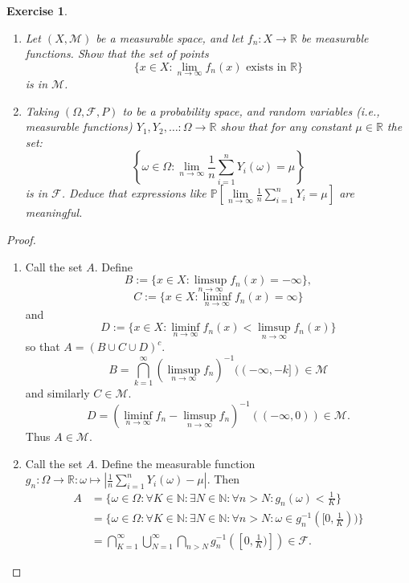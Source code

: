 \documentclass{article}
\newtheorem{exercise}[theorem]{Exercise}
\begin{document}
\begin{exercise}
\begin{enumerate}
\item[(a)] Let \((X, \mathcal{M})\) be a measurable space, and let \( f_n : X \to \mathbb{R} \) be measurable functions. Show that the set of points
    \[
    \{ x \in X : \lim\limits_{n \to \infty} f_n(x) \text{ exists in } \mathbb{R} \}
    \]
    is in \( \mathcal{M} \).
    
\item[(b)] Taking \((\Omega, \mathcal{F}, P)\) to be a probability space, and random variables (i.e., measurable functions) \( Y_1, Y_2, \dots : \Omega \to \mathbb{R} \) show that for any constant \(\mu \in \mathbb{R}\) the set:
    \[
    \left\{ \omega \in \Omega : \lim\limits_{n \to \infty} \frac{1}{n} \sum_{i=1}^{n} Y_i(\omega) = \mu \right\}
    \]
    is in \(\mathcal{F}\). Deduce that expressions like \( \mathbb{P}[\lim\limits_{n \to \infty} \frac{1}{n} \sum_{i=1}^{n} Y_i = \mu] \) are meaningful.
\end{enumerate}
\end{exercise} 
\begin{proof}
\begin{enumerate}
    \item[(a)] Call the set $A$. 
    Define \[B:=\{x\in X:\limsup_{n\to\infty}f_n(x)=-\infty\},\] \[C:=\{x\in X:\liminf_{n\to\infty}f_n(x)=\infty\}\] and \[D:=\{x\in X:\liminf_{n\to\infty}f_n(x)<\limsup_{n\to\infty}f_n(x)\}\] so that $A=(B\cup C\cup D)^c$. \[B=\bigcap_{k=1}^\infty(\limsup_{n\to\infty}f_n)^{-1}((-\infty,-k])\in\mathcal{M}\] and similarly $C\in\mathcal{M}$.\[D=(\liminf_{n\to\infty}f_n-\limsup_{n\to\infty}f_n)^{-1}((-\infty,0))\in\mathcal{M}.\] Thus $A\in\mathcal{M}$.
    \item[(b)] Call the set $A$. Define the measurable function $g_n:\Omega\to\mathbb{R}:\omega\mapsto|\frac{1}{n}\sum_{i=1}^nY_i(\omega)-\mu|$. Then \begin{align*}
        A&=\{\omega\in\Omega:\forall K\in\mathbb{N}:\exists N\in\mathbb{N}:\forall n>N:g_n(\omega)<\frac{1}{K}\}\\&=\{\omega\in\Omega:\forall K\in\mathbb{N}:\exists N\in\mathbb{N}:\forall n>N:\omega\in g_n^{-1}([0,\frac{1}{K}))\}\\&=\bigcap_{K=1}^\infty\bigcup_{N=1}^\infty\bigcap_{n>N}g_n^{-1}([0,\frac{1}{K})])\in\mathcal{F}.
    \end{align*}
\end{enumerate}
\end{proof}
\end{document}
